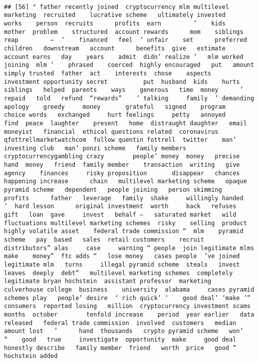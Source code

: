 \documentclass[
]{article}
\begin{document}
\begin{verbatim}
                                                                                                                                                                                                                                                                                                                                                                                                                                                                   
## [56] " father recently joined  cryptocurrency mlm multilevel marketing  recruited    lucrative scheme   ultimately invested    works    person  recruits      profits  earn         ’    kids   mother  problem    structured  account rewards      mom    siblings reap         —  ’    financed   feel  ’ unfair    set      preferred  children   downstream   account      benefits  give   estimate   account earns   day    years    admit  didn’ realize ’   mlm worked      joining  mlm ’    phrased    coerced  highly encouraged   put   amount  simply trusted  father  act    interests  chose    aspects   investment opportunity secret          put  husband  kids    hurts        siblings   helped  parents    ways    generous   time  money      ’  repaid   told   refund  “rewards”    ’ talking     family  ’ demanding  apology    greedy     money       grateful   signed    program   choice words   exchanged     hurt feelings     petty   annoyed      find  peace  laughter    present   home  distraught daughter   email  moneyist   financial  ethical questions related  coronavirus  qfottrellmarketwatchcom  follow quentin fottrell  twitter    man’ investing club   man’ ponzi scheme   family members   cryptocurrencygambling crazy        people’ money  money   precise  hand  money   friend  family member    transaction  writing   give  agency    finances     risky proposition       disappear   chances   happening increase      chain   multilevel marketing scheme   opaque     pyramid scheme   dependent   people joining   person skimming   profits      father   leverage   family  shake     willingly handed   ’  hard lesson      original investment  worth     back   refuses     gift   loan  gave     invest   behalf —   saturated market   wild fluctuations multilevel marketing schemes  risky    selling  product     highly volatile asset    federal trade commission “  mlm    pyramid scheme   pay  based   sales  retail customers    recruit  distributors” alas     case     warning “ people  join legitimate mlms make    money”  ftc adds “   lose money   cases people  ’ve joined  legitimate mlm   turns     illegal pyramid scheme  steals   invest  leaves  deeply  debt”   multilevel marketing schemes  completely legitimate bryan hochstein  assistant professor  marketing   culverhouse college  business    university  alabama     cases pyramid schemes play   people’ desire  ‘ rich quick’ ‘    good deal’ ‘make ’”    consumers  reported losing   million  cryptocurrency investment scams    months  october        tenfold increase    period  year earlier   data released   federal trade commission  involved  customers   median amount lost   ’      hand  thousands   crypto pyramid scheme   won’    “    good   true     investigate  opportunity  make     good deal      honestly describe   family member  friend   worth  price   good ” hochstein added  
\end{verbatim}
\end{document}
